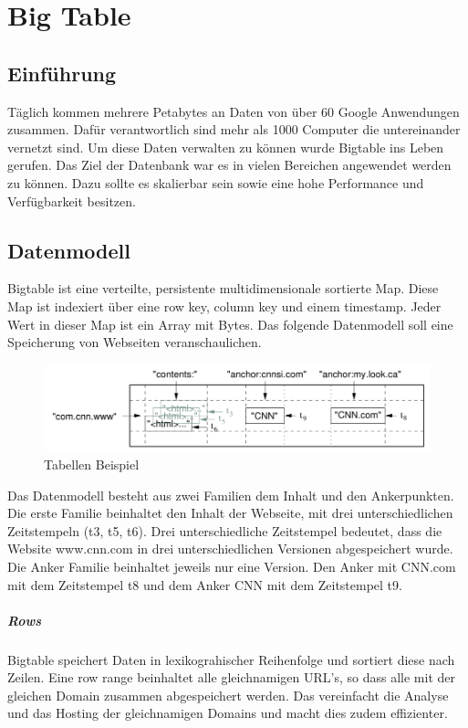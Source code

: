 \chapter{Big Table}
\label{bigTable}

\section{Einführung}
Täglich kommen mehrere Petabytes an Daten von über 60 Google Anwendungen zusammen. Dafür verantwortlich sind mehr als 1000 Computer die untereinander vernetzt sind. Um diese Daten verwalten zu können wurde Bigtable ins Leben gerufen. Das Ziel der Datenbank war es in vielen Bereichen angewendet werden zu können. Dazu sollte es skalierbar sein sowie eine hohe Performance und Verfügbarkeit besitzen.


\section{Datenmodell}
Bigtable ist eine verteilte, persistente multidimensionale sortierte Map. Diese Map ist indexiert über eine row key, column key und einem timestamp. Jeder Wert in dieser Map ist ein Array mit Bytes. Das folgende Datenmodell soll eine Speicherung von Webseiten veranschaulichen.

\begin{figure}[!htpb]
	\centering
	\includegraphics[]{pics/bigtable_schema.png}
	\caption {Tabellen Beispiel}	
\end{figure}

Das Datenmodell besteht aus zwei Familien dem Inhalt und den Ankerpunkten. Die erste Familie beinhaltet den Inhalt der Webseite, mit drei unterschiedlichen Zeitstempeln (t3, t5, t6). Drei unterschiedliche Zeitstempel bedeutet, dass die Website www.cnn.com in drei unterschiedlichen Versionen abgespeichert wurde. Die Anker Familie beinhaltet jeweils nur eine Version. Den Anker mit \glqq CNN.com \grqq mit dem Zeitstempel t8 und dem Anker \glqq CNN \grqq mit dem Zeitstempel t9. 
 
\paragraph{Rows}
Bigtable speichert Daten in lexikograhischer Reihenfolge und sortiert diese nach Zeilen. Eine row range beinhaltet alle gleichnamigen URL’s, so dass alle mit der gleichen Domain zusammen abgespeichert werden. Das vereinfacht die Analyse und das Hosting der gleichnamigen Domains und macht dies zudem effizienter.

